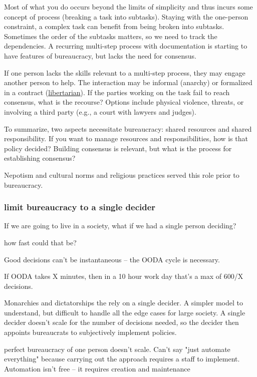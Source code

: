 Most of what you do occurs beyond the limits of simplicity and thus incurs some concept of \gls{process} (breaking a task into subtasks). Staying with the one-person constraint, a complex task can benefit from being broken into subtasks. Sometimes the order of the subtasks matters, so we need to track the dependencies. A recurring multi-step process with documentation is starting to have features of bureaucracy, but lacks the need for consensus. 


If one person lacks the skills relevant to a multi-step process, they may engage another person to help. The interaction may be informal (anarchy) or formalized in a contract (\href{https://en.wikipedia.org/wiki/Libertarianism}{libertarian}). If the parties working on the task fail to reach consensus, what is the recourse? Options include physical violence, threats, or involving a third party (e.g., a court with lawyers and judges). 


To summarize, two aspects necessitate bureaucracy: shared resources and shared responsibility. 
If you want to manage resources and responsibilities, how is that policy decided?  Building consensus is relevant, but what is the process for establishing consensus?

Nepotism and cultural norms and religious practices served this role prior to bureaucracy. 


\subsubsection{limit bureaucracy to a single decider}
If we are going to live in a society, what if we had a single person deciding?

how fast could that be?

Good decisions can't be instantaneous -- the OODA cycle is necessary.

If OODA takes X minutes, then in a 10 hour work day that's a max of 600/X decisions.



Monarchies and dictatorships the rely on a single decider. A simpler model to understand, but difficult to handle all the edge cases for large society. A single decider doesn't scale for the number of decisions needed, so the decider then appoints bureaucrats to subjectively implement policies. 


perfect bureaucracy of one person doesn't scale. Can't say "just automate everything" because carrying out the approach requires a staff to implement. Automation isn't free -- it requires creation and maintenance

